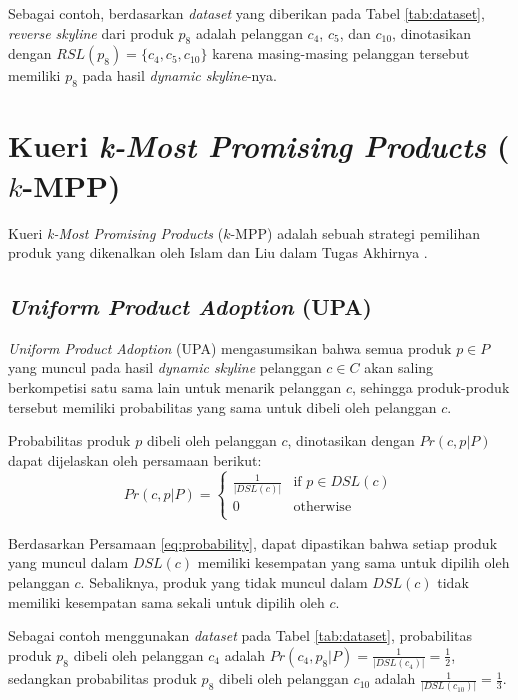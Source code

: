 Sebagai contoh, berdasarkan \textit{dataset} yang diberikan pada Tabel \ref{tab:dataset}, \textit{reverse skyline} dari produk $p_8$ adalah pelanggan $c_4$, $c_5$, dan $c_{10}$, dinotasikan dengan $RSL(p_8) = \{c_4, c_5, c_{10}\}$ karena masing-masing pelanggan tersebut memiliki $p_8$ pada hasil \textit{dynamic skyline}-nya.

\section{Kueri \textit{k-Most Promising Products} ($k$-MPP)}
\tab Kueri \textit{k-Most Promising Products} ($k$-MPP) adalah sebuah strategi pemilihan produk yang dikenalkan oleh Islam dan Liu dalam Tugas Akhirnya \cite{kmpp}.

\subsection{\textit{Uniform Product Adoption} (UPA)}
\tab \textit{Uniform Product Adoption} (UPA) mengasumsikan bahwa semua produk $p \in P$ yang muncul pada hasil \textit{dynamic skyline} pelanggan $c \in C$ akan saling berkompetisi satu sama lain untuk menarik pelanggan $c$, sehingga produk-produk tersebut memiliki probabilitas yang sama untuk dibeli oleh pelanggan $c$.

Probabilitas produk $p$ dibeli oleh pelanggan $c$, dinotasikan dengan $Pr(c, p|P)$ dapat dijelaskan oleh persamaan berikut:
\begin{equation}\label{eq:probability}
Pr(c, p|P) = \left\{
				\begin{array}{ll}
					\frac{1}{|DSL(c)|} & \text{if } p \in DSL(c)\\
					0 & \text{otherwise}\\
				\end{array}
				\right.
\end{equation}

Berdasarkan Persamaan \ref{eq:probability}, dapat dipastikan bahwa setiap produk yang muncul dalam $DSL(c)$ memiliki kesempatan yang sama untuk dipilih oleh pelanggan $c$. Sebaliknya, produk yang tidak muncul dalam $DSL(c)$ tidak memiliki kesempatan sama sekali untuk dipilih oleh $c$.

\pagebreak
Sebagai contoh menggunakan \textit{dataset} pada Tabel \ref{tab:dataset}, probabilitas produk $p_8$ dibeli oleh pelanggan $c_4$ adalah $Pr(c_4, p_8|P) = \frac{1}{|DSL(c_4)|} = \frac{1}{2}$, sedangkan probabilitas produk $p_8$ dibeli oleh pelanggan $c_{10}$ adalah $\frac{1}{|DSL(c_{10})|} = \frac{1}{3}$.

